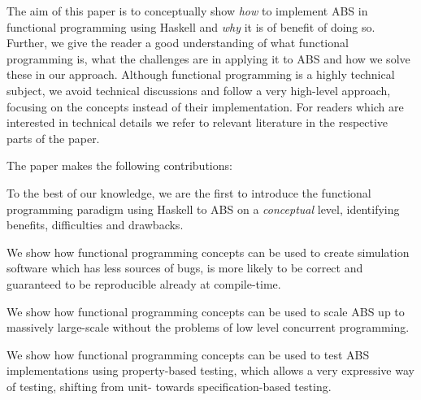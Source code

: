 The aim of this paper is to conceptually show \textit{how} to implement ABS in functional programming using Haskell and \textit{why} it is of benefit of doing so. Further, we give the reader a good understanding of what functional programming is, what the challenges are in applying it to ABS and how we solve these in our approach. Although functional programming is a highly technical subject, we avoid technical discussions and follow a very high-level approach, focusing on the concepts instead of their implementation. For readers which are interested in technical details we refer to relevant literature in the respective parts of the paper.

The paper makes the following contributions:

\begin{itemize*}
	\item To the best of our knowledge, we are the first to introduce the functional programming paradigm using Haskell to ABS on a \textit{conceptual} level, identifying benefits, difficulties and drawbacks.
	\item We show how functional programming concepts can be used to create simulation software which has less sources of bugs, is more likely to be correct and guaranteed to be reproducible already at compile-time.
	\item We show how functional programming concepts can be used to scale ABS up to massively large-scale without the problems of low level concurrent programming.
	\item We show how functional programming concepts can be used to test ABS implementations using property-based testing, which allows a very expressive way of testing, shifting from unit- towards specification-based testing.
\end{itemize*}

